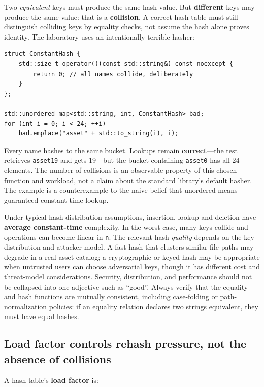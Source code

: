 Two \emph{equivalent} keys must produce the same hash value. But \textbf{different} keys may produce the same value: that is a \textbf{collision}. A correct hash table must still distinguish colliding keys by equality checks, not assume the hash alone proves identity. The laboratory uses an intentionally terrible hasher:

\begin{verbatim}
struct ConstantHash {
    std::size_t operator()(const std::string&) const noexcept {
        return 0; // all names collide, deliberately
    }
};

std::unordered_map<std::string, int, ConstantHash> bad;
for (int i = 0; i < 24; ++i)
    bad.emplace("asset" + std::to_string(i), i);
\end{verbatim}

Every name hashes to the same bucket. Lookups remain \textbf{correct}---the test retrieves \texttt{asset19} and gets 19---but the bucket containing \texttt{asset0} has all 24 elements. The number of collisions is an observable property of this chosen function and workload, not a claim about the standard library's default hasher. The example is a counterexample to the naive belief that unordered means guaranteed constant-time lookup.

Under typical hash distribution assumptions, insertion, lookup and deletion have \textbf{average constant-time} complexity. In the worst case, many keys collide and operations can become linear in \texttt{n}. The relevant hash \emph{quality} depends on the key distribution and attacker model. A fast hash that clusters similar file paths may degrade in a real asset catalog; a cryptographic or keyed hash may be appropriate when untrusted users can choose adversarial keys, though it has different cost and threat-model considerations. Security, distribution, and performance should not be collapsed into one adjective such as ``good''. Always verify that the equality and hash functions are mutually consistent, including case-folding or path-normalization policies: if an equality relation declares two strings equivalent, they must have equal hashes.

\subsection{Load factor controls rehash pressure, not the absence of collisions}\label{01-foundations-i-ch006-load-factor-controls-rehash-pressure-not-the-absence-of-collisions}

A hash table's \textbf{load factor} is:

